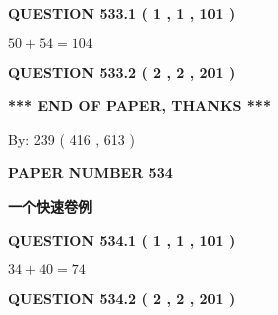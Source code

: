 \documentclass{ctexart}
\begin{document}
   
  
\vspace{0.2in}
  
{\textbf{\Large{QUESTION
533.1 
 ( 1 , 1 , 101 )
}}}
  
  
 
 

$ %
50 +  %
54=   %
104$
 
 
  
\vspace{0.2in}
  
{\textbf{\Large{QUESTION
533.2 
 ( 2 , 2 , 201 )
}}}
  
  
   
   
 \vspace{0.2in}
 
   
   
   
   
\vspace{1.0in} 
{\textbf{\large{ *** END OF PAPER, THANKS *** }}} 
   
   
\hspace{1.0in} By: 
 239 ( 416 ,  613 )
   
   
   
   
\newpage 
\setcounter{page}{ 
   534001 } 
   
   
   
   
 {\textbf{ \Large{ PAPER NUMBER  534  }}}
   
   
\vspace{0.2in}
   
   
   
   
   
   
 \vspace{0.2in}
{\LARGE {\textbf{ 一个快速卷例}}}
   
   
  
\vspace{0.2in}
  
{\textbf{\Large{QUESTION
534.1 
 ( 1 , 1 , 101 )
}}}
  
  
 
 

$ %
34 +  %
40=   %
74$
 
 
  
\vspace{0.2in}
  
{\textbf{\Large{QUESTION
534.2 
 ( 2 , 2 , 201 )
}}}
  
  
   
\end{document}
